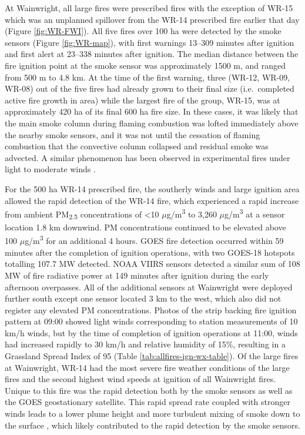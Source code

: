 \documentclass[fire,article,submit,moreauthors]{mdpi}
\begin{document}
At Wainwright, all large fires were prescribed fires with the exception
of WR-15 which was an unplanned spillover from the WR-14 prescribed fire
earlier that day (Figure \ref{fig:WR-FWI}). All five fires over 100 ha
were detected by the smoke sensors (Figure \ref{fig:WR-map}), with first
warnings 13--309 minutes after ignition and first alert at 23--338
minutes after ignition. The median distance between the fire ignition
point at the smoke sensor was approximately 1500 m, and ranged from 500
m to 4.8 km. At the time of the first warning, three (WR-12, WR-09,
WR-08) out of the five fires had already grown to their final size
(i.e.~completed active fire growth in area) while the largest fire of
the group, WR-15, was at approximately 420 ha of its final 600 ha fire
size. In these cases, it was likely that the main smoke column during
flaming combustion was lofted immediately above the nearby smoke
sensors, and it was not until the cessation of flaming combustion that
the convective column collapsed and residual smoke was advected. A
similar phenomenon has been observed in experimental fires under light
to moderate winds \citep{hudaStudyFuelSmokeDynamics2020}.

For the 500 ha WR-14 prescribed fire, the southerly winds and large
ignition area allowed the rapid detection of the WR-14 fire, which
experienced a rapid increase from ambient PM\textsubscript{2.5}
concentrations of \textless10 \(\mu\)g/m\textsuperscript{3} to 3,260
\(\mu\)g/m\textsuperscript{3} at a sensor location 1.8 km downwind. PM
concentrations continued to be elevated above 100
\(\mu\)g/m\textsuperscript{3} for an additional 4 hours. GOES fire
detection occurred within 59 minutes after the completion of ignition
operations, with two GOES-18 hotspots totalling 107.7 MW detected. NOAA
VIIRS sensors detected a similar sum of 108 MW of fire radiative power
at 149 minutes after ignition during the early afternoon overpasses. All
of the additional sensors at Wainwright were deployed further south
except one sensor located 3 km to the west, which also did not register
any elevated PM concentrations. Photos of the strip backing fire
ignition pattern at 09:00 showed light winds corresponding to station
measurements of 10 km/h winds, but by the time of completion of ignition
operations at 11:00, winds had increased rapidly to 30 km/h and relative
humidity of 15\%, resulting in a Grassland Spread Index of 95 (Table
\ref{tab:allfires-ign-wx-table}). Of the large fires at Wainwright,
WR-14 had the most severe fire weather conditions of the large fires and
the second highest wind speeds at ignition of all Wainwright fires.
Unique to this fire was the rapid detection both by the smoke sensors as
well as the GOES geostationary satellite. This rapid spread rate coupled
with stronger winds leads to a lower plume height and more turbulent
mixing of smoke down to the surface
\citep{freitasTechnicalNoteSensitivity2010}, which likely contributed to
the rapid detection by the smoke sensors.
\end{document}

